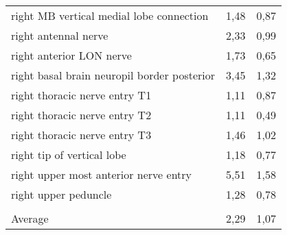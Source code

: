 \begin{tabular}{lcc}
 right MB vertical medial lobe connection    & 1,48          & 0,87             \\
 right antennal nerve                        & 2,33          & 0,99             \\
 right anterior LON nerve                    & 1,73          & 0,65             \\
 right basal brain neuropil border posterior & 3,45          & 1,32             \\
 right thoracic nerve entry T1               & 1,11          & 0,87             \\
 right thoracic nerve entry T2               & 1,11          & 0,49             \\
 right thoracic nerve entry T3               & 1,46          & 1,02             \\
 right tip of vertical lobe                  & 1,18          & 0,77             \\
 right upper most anterior nerve entry       & 5,51          & 1,58             \\
 right upper peduncle                        & 1,28          & 0,78             \\
                                             &               &                  \\ \hline \hline
 Average                                     & 2,29          & 1,07             \\
\hline
\end{tabular}